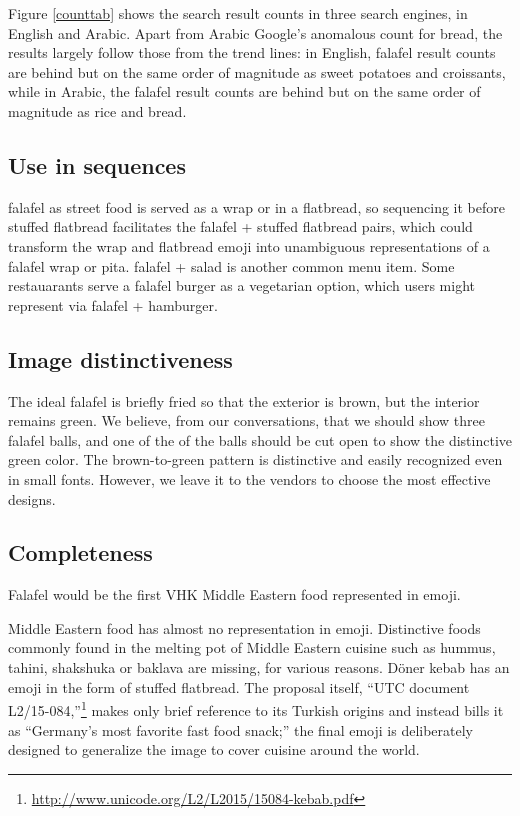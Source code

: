 \documentclass[a4paper,10pt]{article}
\begin{document}
Figure \ref{counttab} shows the search result counts in three search engines, in English
and Arabic. Apart from Arabic Google's anomalous count for bread, the results largely
follow those from the trend lines: in English, falafel result counts are behind but
on the same order of magnitude as sweet potatoes and croissants, while in Arabic, the
falafel result counts are behind but on the same order of magnitude as rice and bread.


\subsection{Use in sequences}\label{seqsec}
{\sc falafel} as street food is served as a wrap or in a flatbread, so sequencing it before {\sc stuffed flatbread}
facilitates the {\sc falafel}
+ {\sc stuffed flatbread} pairs, which could transform the wrap and flatbread emoji
into unambiguous representations of a falafel wrap or pita. {\sc falafel} + {\sc salad} is
another common menu item. Some restauarants serve a falafel burger as a vegetarian option,
which users might represent via {\sc falafel} + {\sc hamburger}.


\subsection{Image distinctiveness}
The ideal falafel is briefly fried so that the exterior is brown, but the interior remains green. We believe, from
our conversations, that we should show three falafel balls, and one of the of the balls should be cut open to show
the distinctive green color. The brown-to-green pattern is distinctive and easily recognized even in small fonts.
However, we leave it to the vendors to choose the most effective designs.

\subsection{Completeness}
{\sc Falafel} would be the first VHK Middle Eastern food represented in emoji.

Middle Eastern food has almost no representation in emoji. Distinctive foods
commonly found in the melting pot of Middle Eastern cuisine such as hummus, tahini, shakshuka or
baklava are missing, for various reasons.  Döner kebab has an emoji in the form
of {\sc stuffed flatbread}. The proposal itself, ``UTC document
L2/15-084,''\footnote{\url{http://www.unicode.org/L2/L2015/15084-kebab.pdf}} makes
only brief reference to its Turkish origins and instead bills it as ``Germany's most
favorite fast food snack;'' the final emoji is deliberately designed to generalize the
image to cover cuisine around the world.
\end{document}
